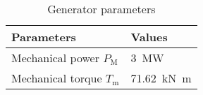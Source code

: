 \begin{table}[!h]
        \caption{Generator parameters}
        \label{tab:genparameters}
        \centering
        \begin{tabular}{ll}
                \toprule
                Parameters & Values \\
                \midrule
                Mechanical power $P_{\mathrm{M}}$ & \SI{3}{\mega\watt} \\
                Mechanical torque $T_{\mathrm{m}}$ & \SI{71.62}{\kilo\newton\meter} \\
                \bottomrule
        \end{tabular}
\end{table}


